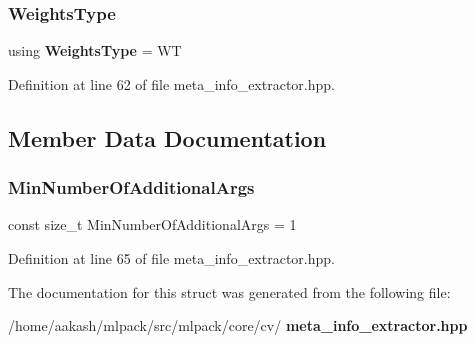 \subsubsection{Weights\+Type}
{\footnotesize\ttfamily using \textbf{ Weights\+Type} =  WT}



Definition at line 62 of file meta\+\_\+info\+\_\+extractor.\+hpp.



\subsection{Member Data Documentation}
\mbox{\label{structmlpack_1_1cv_1_1TrainFormBase5_adacbdda6f41a542559105d6e48d1cfc2}} 
\subsubsection{Min\+Number\+Of\+Additional\+Args}
{\footnotesize\ttfamily const size\+\_\+t Min\+Number\+Of\+Additional\+Args = 1\hspace{0.3cm}{\ttfamily [static]}}



Definition at line 65 of file meta\+\_\+info\+\_\+extractor.\+hpp.



The documentation for this struct was generated from the following file\+:\begin{DoxyCompactItemize}
\item 
/home/aakash/mlpack/src/mlpack/core/cv/\textbf{ meta\+\_\+info\+\_\+extractor.\+hpp}\end{DoxyCompactItemize}

